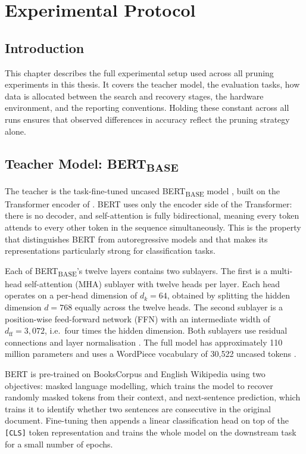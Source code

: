 \chapter{Experimental Protocol}
\label{chap:protocol}

\section{Introduction}

This chapter describes the full experimental setup used across all pruning
experiments in this thesis. It covers the teacher model, the evaluation tasks,
how data is allocated between the search and recovery stages, the hardware
environment, and the reporting conventions. Holding these constant across all
runs ensures that observed differences in accuracy reflect the pruning strategy
alone.

\section{Teacher Model: BERT\textsubscript{BASE}}
\label{sec:teacher}

The teacher is the task-fine-tuned uncased BERT\textsubscript{BASE} model
\citep{devlin2019bert}, built on the Transformer encoder of
\citet{vaswani2017attention}. BERT uses only the encoder side of the
Transformer: there is no decoder, and self-attention is fully bidirectional,
meaning every token attends to every other token in the sequence simultaneously.
This is the property that distinguishes BERT from autoregressive models and that
makes its representations particularly strong for classification tasks.

Each of BERT\textsubscript{BASE}'s twelve layers contains two sublayers. The
first is a multi-head self-attention (MHA) sublayer with twelve heads per layer.
Each head operates on a per-head dimension of $d_k = 64$, obtained by splitting
the hidden dimension $d = 768$ equally across the twelve heads. The second
sublayer is a position-wise feed-forward network (FFN) with an intermediate
width of $d_{\mathrm{ff}} = 3{,}072$, i.e.\ four times the hidden dimension.
Both sublayers use residual connections \citep{he2016deep} and layer
normalisation \citep{ba2016layer}. The full model has approximately 110 million
parameters and uses a WordPiece vocabulary of 30{,}522 uncased tokens
\citep{wu2016googles}.

BERT is pre-trained on BooksCorpus \citep{zhu2015aligning} and English
Wikipedia using two objectives: masked language modelling, which trains the
model to recover randomly masked tokens from their context, and next-sentence
prediction, which trains it to identify whether two sentences are consecutive in
the original document. Fine-tuning then appends a linear classification head on
top of the \texttt{[CLS]} token representation and trains the whole model on the
downstream task for a small number of epochs.

